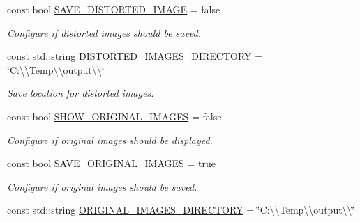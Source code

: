 \begin{DoxyCompactItemize}
const bool \mbox{\hyperlink{namespacedto_1_1_configuration_a1706f8e4ae268f98714d25206f6b9baa}{S\+A\+V\+E\+\_\+\+D\+I\+S\+T\+O\+R\+T\+E\+D\+\_\+\+I\+M\+A\+GE}} = false
\begin{DoxyCompactList}\small\item\em Configure if distorted images should be saved. \end{DoxyCompactList}\item 
\mbox{\label{namespacedto_1_1_configuration_afb5281daa2de521de6070cd41969d6d6}} 
const std\+::string \mbox{\hyperlink{namespacedto_1_1_configuration_afb5281daa2de521de6070cd41969d6d6}{D\+I\+S\+T\+O\+R\+T\+E\+D\+\_\+\+I\+M\+A\+G\+E\+S\+\_\+\+D\+I\+R\+E\+C\+T\+O\+RY}} = \char`\"{}C\+:\textbackslash{}\textbackslash{}\+Temp\textbackslash{}\textbackslash{}output\textbackslash{}\textbackslash{}\char`\"{}
\begin{DoxyCompactList}\small\item\em Save location for distorted images. \end{DoxyCompactList}\item 
\mbox{\label{namespacedto_1_1_configuration_a5fc8ef516cf172917bd97635a0c40d78}} 
const bool \mbox{\hyperlink{namespacedto_1_1_configuration_a5fc8ef516cf172917bd97635a0c40d78}{S\+H\+O\+W\+\_\+\+O\+R\+I\+G\+I\+N\+A\+L\+\_\+\+I\+M\+A\+G\+ES}} = false
\begin{DoxyCompactList}\small\item\em Configure if original images should be displayed. \end{DoxyCompactList}\item 
\mbox{\label{namespacedto_1_1_configuration_afd3ce1b8f67a0ca5762ff8b22b3cae04}} 
const bool \mbox{\hyperlink{namespacedto_1_1_configuration_afd3ce1b8f67a0ca5762ff8b22b3cae04}{S\+A\+V\+E\+\_\+\+O\+R\+I\+G\+I\+N\+A\+L\+\_\+\+I\+M\+A\+G\+ES}} = true
\begin{DoxyCompactList}\small\item\em Configure if original images should be saved. \end{DoxyCompactList}\item 
\mbox{\label{namespacedto_1_1_configuration_aad3c29d768e18ba0b115c758a792e831}} 
const std\+::string \mbox{\hyperlink{namespacedto_1_1_configuration_aad3c29d768e18ba0b115c758a792e831}{O\+R\+I\+G\+I\+N\+A\+L\+\_\+\+I\+M\+A\+G\+E\+S\+\_\+\+D\+I\+R\+E\+C\+T\+O\+RY}} = \char`\"{}C\+:\textbackslash{}\textbackslash{}\+Temp\textbackslash{}\textbackslash{}output\textbackslash{}\textbackslash{}\char`\"{}

\end{DoxyCompactItemize}
